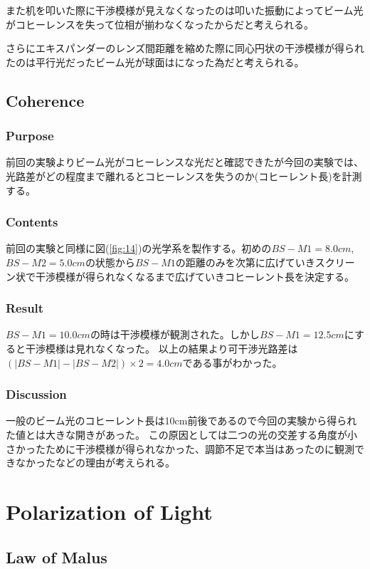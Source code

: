 \documentclass[11pt, a4paper]{jsarticle}
\begin{document}
また机を叩いた際に干渉模様が見えなくなったのは叩いた振動によってビーム光がコヒーレンスを失って位相が揃わなくなったからだと考えられる。

さらにエキスパンダーのレンズ間距離を縮めた際に同心円状の干渉模様が得られたのは平行光だったビーム光が球面はになった為だと考えられる。


\subsection{Coherence}
\subsubsection{Purpose}
前回の実験よりビーム光がコヒーレンスな光だと確認できたが今回の実験では、光路差がどの程度まで離れるとコヒーレンスを失うのか(コヒーレント長)を計測する。
\subsubsection{Contents}
前回の実験と同様に図(\ref{fig:14})の光学系を製作する。初めの$BS-M1 = 8.0cm$,$BS-M2 = 5.0cm$の状態から$BS-M1$の距離のみを次第に広げていきスクリーン状で干渉模様が得られなくなるまで広げていきコヒーレント長を決定する。
\subsubsection{Result}
$BS-M1 = 10.0cm$の時は干渉模様が観測された。しかし$BS-M1 = 12.5cm$にすると干渉模様は見れなくなった。
以上の結果より可干渉光路差は$(|BS-M1|-|BS-M2|) \times 2 = 4.0cm$である事がわかった。
\subsubsection{Discussion}
一般のビーム光のコヒーレント長は10cm前後であるので今回の実験から得られた値とは大きな開きがあった。
この原因としては二つの光の交差する角度が小さかったために干渉模様が得られなかった、調節不足で本当はあったのに観測できなかったなどの理由が考えられる。

\section{Polarization of Light}
\subsection{Law of Malus}
\end{document}
